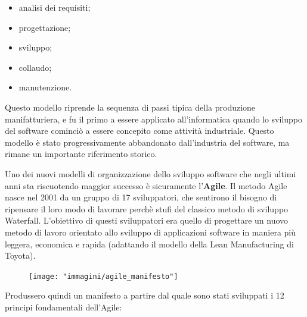\begin{itemize}
	\itemsep-0.3em
	\item analisi dei requisiti;
	\item progettazione;
	\item sviluppo;
	\item collaudo;
	\item manutenzione.
\end{itemize}

Questo modello riprende la sequenza di passi tipica della produzione manifatturiera, e fu il primo a essere applicato all'informatica quando lo
sviluppo del software cominciò a essere concepito come attività industriale. Questo modello è stato progressivamente abbandonato dall'industria
del software, ma rimane un importante riferimento storico.

Uno dei nuovi modelli di organizzazione dello sviluppo software che negli ultimi anni sta riscuotendo maggior successo è sicuramente l’\textbf{Agile}.
Il metodo Agile nasce nel 2001 da un gruppo di 17 sviluppatori, che sentirono il bisogno di ripensare il loro modo di lavorare perchè stufi del
classico metodo di sviluppo Waterfall.
L'obiettivo di questi sviluppatori era quello di progettare un nuovo metodo di lavoro orientato allo sviluppo di applicazioni software in maniera più
leggera, economica e rapida (adattando il modello della Lean Manufacturing di Toyota).

\begin{figure}[h!]
	\centering
	\texttt{[image: "immagini/agile\_manifesto"]}
\end{figure}

Produssero quindi un manifesto a partire dal quale sono stati sviluppati i 12 principi fondamentali dell'Agile:

